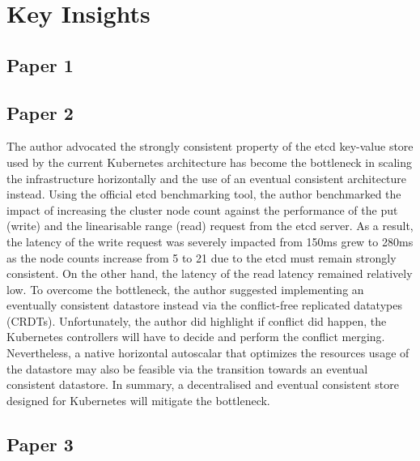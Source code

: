\section{Key Insights}%
\label{sec:Key Insights}
\subsection{Paper 1}%
\label{sub:Paper 1}






\subsection{Paper 2}%
\label{sub:Paper 2}
The author advocated the strongly consistent property of the etcd key-value store used by the current Kubernetes architecture has become the bottleneck in scaling the infrastructure horizontally and the use of an eventual consistent architecture instead.
Using the official etcd benchmarking tool, the author benchmarked the impact of increasing the cluster node count against the performance of the put (write) and the linearisable range (read) request from the etcd server.
As a result, the latency of the write request was severely impacted from 150ms grew to 280ms as the node counts increase from 5 to 21 due to the etcd must remain strongly consistent.
On the other hand, the latency of the read latency remained relatively low.
To overcome the bottleneck, the author suggested implementing an eventually consistent datastore instead via the conflict-free replicated datatypes (CRDTs).
Unfortunately, the author did highlight if conflict did happen, the Kubernetes controllers will have to decide and perform the conflict merging.
Nevertheless, a native horizontal autoscalar that optimizes the resources usage of the datastore may also be feasible via the transition towards an eventual consistent datastore.
In summary, a decentralised and eventual consistent store designed for Kubernetes will mitigate the bottleneck.












\subsection{Paper 3}%
\label{sub:Paper 3}



